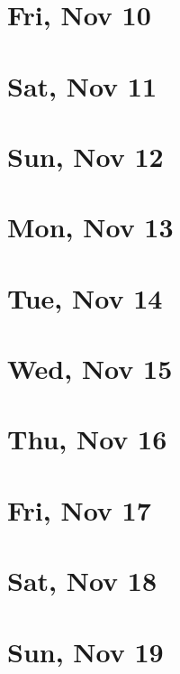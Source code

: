 	\section{Fri, Nov 10}
		
	\section{Sat, Nov 11}
		
	\section{Sun, Nov 12}
		
	\section{Mon, Nov 13}
		
	\section{Tue, Nov 14}
		
	\section{Wed, Nov 15}
		
	\section{Thu, Nov 16}
		
	\section{Fri, Nov 17}
		
	\section{Sat, Nov 18}
		
	\section{Sun, Nov 19}
		

